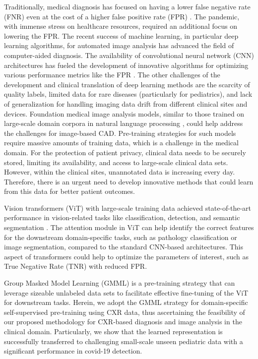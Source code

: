 \documentclass[10pt,journal,compsoc]{IEEEtran}
\begin{document}
Traditionally, medical diagnosis has focused on having a lower false negative rate (FNR) even at the cost of a higher false positive rate (FPR) \cite{woloshin2020false}. The pandemic, with immense stress on healthcare resources, required an additional focus on lowering the FPR. The recent success of machine learning, in particular deep learning algorithms, for automated image analysis has advanced the field of computer-aided diagnosis. The availability of convolutional neural network (CNN) architectures has fueled the development of innovative algorithms for optimizing various performance metrics like the FPR \cite{kim2021deep}. The other challenges of the development and clinical translation of deep learning methods are the scarcity of quality labels, limited data for rare diseases (particularly for pediatrics), and lack of generalization for handling imaging data drift from different clinical sites and devices. Foundation medical image analysis models, similar to those trained on large-scale domain corpora in natural language processing \cite{gu2021domain}, could help address the challenges for image-based CAD. Pre-training strategies for such models require massive amounts of training data, which is a challenge in the medical domain. For the protection of patient privacy, clinical data needs to be securely stored, limiting its availability, and access to large-scale clinical data sets.  However, within the clinical sites, unannotated data is increasing every day. Therefore, there is an urgent need to develop innovative methods that could learn from this data for better patient outcomes.             

Vision transformers (ViT) with large-scale training data achieved state-of-the-art performance in vision-related tasks like classification, detection, and semantic segmentation \cite{han2022survey,parvaiz2022vision}. The attention module in ViT can help identify the correct features for the downstream domain-specific tasks, such as pathology classification or image segmentation, compared to the standard CNN-based architectures. This aspect of transformers could help to optimize the parameters of interest, such as True Negative Rate (TNR) with reduced FPR. 

Group Masked Model Learning (GMML) is a pre-training strategy that can leverage sizeable unlabeled data sets to facilitate effective fine-tuning of the ViT \cite{atito2022gmml} for downstream tasks. Herein, we adopt the GMML strategy for domain-specific self-supervised pre-training using CXR data, thus ascertaining the feasibility of our proposed methodology for CXR-based diagnosis and image analysis in the clinical domain. Particularly, we show that the learned representation is successfully transferred to challenging small-scale unseen pediatric data with a significant performance in covid-19 detection.    
\end{document}
